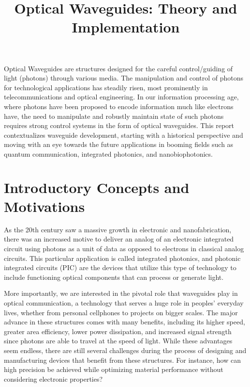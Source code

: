 \documentclass[10pt]{article}
\begin{document}
\noindent



\title{Optical Waveguides: Theory and Implementation}




\maketitle


\abstract
Optical Waveguides are structures designed for the careful control/guiding of light (photons) through various media. The manipulation and control of photons 
for technological applications has steadily risen, most prominently in telecommunications and optical engineering. In our information 
processing age, where photons have been proposed to encode information much like electrons have, the need to manipulate and robustly maintain state 
of such photons requires strong control systems in the form of optical waveguides. This report contextualizes waveguide development, 
starting with a historical perspective and moving with an eye towards the future applications in booming fields such as quantum communication, integrated photonics, 
and nanobiophotonics. 

\section{Introductory Concepts and Motivations}

As the 20th century saw a massive growth in electronic and nanofabrication, 
there was an increased motive to deliver an analog of an electronic integrated
circuit using photons as a unit of data as opposed to electrons in classical analog circuits. 
This particular application is called integrated photonics, and photonic integrated circuits (PIC) 
are the devices that utilize this type of technology to include functioning optical components that can 
process or generate light. 

More importantly, we are interested in the pivotal role that waveguides play in 
optical communication, a technology that serves a huge role in peoples’ everyday lives, whether from personal 
cellphones to projects on bigger scales. The major advance in these structures comes with many benefits, 
including its higher speed, greater area efficiency, lower power dissipation, and increased signal strength 
since photons are able to travel at the speed of light. While these advantages seem endless, there are still 
several challenges during the process of designing and manufacturing devices that benefit from these structures.
For instance, how can high precision be achieved while optimizing material performance without considering electronic 
properties? 
\end{document}
